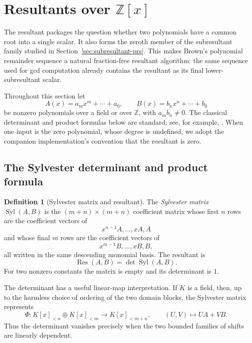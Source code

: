\documentclass[11pt]{book}
\theoremstyle{definition}
\newtheorem{definition}[theorem]{Definition}
\newcommand{\ZZ}{\mathbb Z}
\begin{document}
\section{Resultants over $\ZZ[x]$}\label{sec:resultants}

The resultant packages the question whether two polynomials have a common
root into a single scalar.  It also forms the zeroth member of the
subresultant family studied in Section~\ref{sec:subresultant-prs}.  This makes
Brown's polynomial remainder sequence a natural fraction-free resultant
algorithm: the same sequence used for gcd computation already contains the
resultant as its final lower-subresultant scalar.

Throughout this section let
\[
 A(x)=a_mx^m+\cdots+a_0,
 \qquad
 B(x)=b_nx^n+\cdots+b_0
\]
be nonzero polynomials over a field or over $\ZZ$, with $a_m b_n\ne0$.
The classical determinant and product formulas below are standard; see, for
example, \cite{Sturmfels2002,vonZurGathenGerhard2013}.  When one input is
the zero polynomial, whose degree is undefined, we adopt the companion
implementation's convention that the resultant is zero.

\subsection{The Sylvester determinant and product formula}

\begin{definition}[Sylvester matrix and resultant]
The \emph{Sylvester matrix} $\operatorname{Syl}(A,B)$ is the
$(m+n)\times(m+n)$ coefficient matrix whose first $n$ rows are the
coefficient vectors of
\[
 x^{n-1}A,\ldots,xA,A
\]
and whose final $m$ rows are the coefficient vectors of
\[
 x^{m-1}B,\ldots,xB,B,
\]
all written in the same descending monomial basis.  The resultant is
\begin{equation}\label{eq:resultant-sylvester}
 \operatorname{Res}(A,B)=\det\operatorname{Syl}(A,B).
\end{equation}
For two nonzero constants the matrix is empty and its determinant is $1$.
\end{definition}

The determinant has a useful linear-map interpretation.  If $K$ is a field,
then, up to the harmless choice of ordering of the two domain blocks,
the Sylvester matrix represents
\[
 \Phi:K[x]_{<n}\oplus K[x]_{<m}\longrightarrow K[x]_{<m+n},
 \qquad
 (U,V)\longmapsto UA+VB.
\]
Thus the determinant vanishes precisely when the two bounded families of
shifts are linearly dependent.
\end{document}
